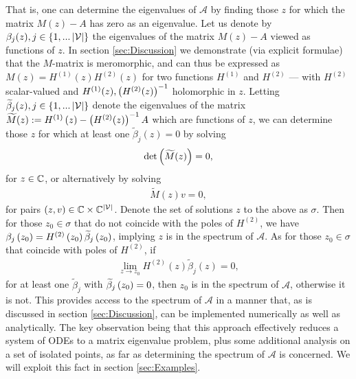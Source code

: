 That is, one can determine the eigenvalues of $\mathcal{A}$ by finding those $z$ for which the matrix $M(z)-A$ has zero as an eigenvalue.
Let us denote by $\beta_j(z), j\in\left\{ 1,...\left\lvert \mathcal{V} \right\rvert \right\}$ the eigenvalues of the matrix $M(z)-A$ viewed as  functions of $z$.
In section \ref{sec:Discussion} we demonstrate (via explicit formulae) that the $M$-matrix is meromorphic, and can thus be expressed as $M(z) = H^{(1)}(z)H^{(2)}(z)$ for two functions $H^{(1)}$ and $H^{(2)}$ --- with $H^{(2)}$ scalar-valued and $H^{(1)}(z), \left( H^{(2)}(z) \right)^{-1}$ holomorphic in $z$.
Letting $\widetilde{\beta}_j(z), j\in\left\{ 1,...\left\lvert \mathcal{V} \right\rvert \right\}$ denote the eigenvalues of the matrix $\widetilde{M}(z) := H^{(1)}\left( z \right) - \left( H^{(2)}(z) \right)^{-1}A$ which are  functions of $z$, we can determine those $z$ for which at least one $\widetilde{\beta}_j(z)=0$ by solving
\begin{align*}
	\mathrm{det}\left( \widetilde{M}(z) \right) = 0,
\end{align*}
for $z\in\mathbb{C}$, or alternatively by solving
\begin{align*}
	\widetilde{M}(z)v = 0,
\end{align*}
for pairs $\left( z,v \right)\in\mathbb{C}\times\mathbb{C}^{\left\lvert \mathcal{V} \right\rvert}$.
Denote the set of solutions $z$ to the above as $\sigma$.
Then for those $z_0\in\sigma$ that do not coincide with the poles of $H^{(2)}$, we have $\beta_{j}\left( z_0 \right) = H^{(2)}\left( z_0 \right)\widetilde{\beta}_j\left( z_0 \right)$, implying $z$ is in the spectrum of $\mathcal{A}$.
As for those $z_0\in\sigma$ that coincide with poles of $H^{(2)}$, if
\begin{align*}
	\lim_{z\rightarrow z_0}H^{(2)}(z)\widetilde{\beta}_j(z) = 0,
\end{align*} 
for at least one  $\widetilde{\beta}_j$ with $\widetilde{\beta}_j\left( z_0 \right)=0$, then $z_0$ is in the spectrum of $\mathcal{A}$, otherwise it is not.
This provides access to the spectrum of $\mathcal{A}$ in a manner that, as is discussed in section \ref{sec:Discussion}, can be implemented numerically as well as analytically.
The key observation being that this approach effectively reduces a system of ODEs to a matrix eigenvalue problem, plus some additional analysis on a set of isolated points, as far as determining the spectrum of $\mathcal{A}$ is concerned.
We will exploit this fact in section \ref{sec:Examples}.

